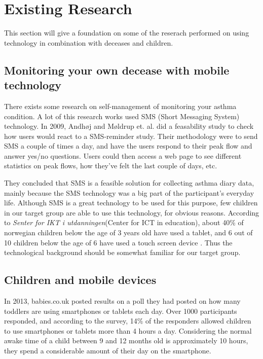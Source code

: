 \section{Existing Research}
\label{sec:existing-research}

This section will give a foundation on some of the reserach performed on using technology in combination with deceases and children. 


\subsection{Monitoring your own decease with mobile technology}
There exists some research on self-management of monitoring your asthma condition. A lot of this research works used SMS (Short Messaging System) technology. In 2009, Andh\o j and M\o ldrup et. al.\cite{anhoj2004feasibility} did a feasability study to check how users would react to a SMS-reminder study. Their methodology were to send SMS a couple of times a day, and have the users respond to their peak flow and answer yes/no questions. Users could then access a web page to see different statistics on peak flows, how they've felt the last couple of days, etc.

They concluded that SMS is a feasible solution for collecting asthma diary data, mainly because the SMS technology was a big part of the participant's everyday life. Although SMS is a great technology to be used for this purpose, few children in our target group are able to use this technology, for obvious reasons. According to \emph{Senter for IKT i utdanningen}(Center for ICT in education), about 40\% of norwegian children below the age of 3 years old have used a tablet, and 6 out of 10 children below the age of 6 have used a touch screen device \cite{nrkchilduse}. Thus the technological background should be somewhat familiar for our target group. 

\subsection{Children and mobile devices}
In 2013, babies.co.uk posted results on a poll they had posted on how many toddlers are using smartphones or tablets each day\cite{babiesusageoftablets}. Over 1000 participants responded,  and according to the survey, 14\% of the responders allowed children to use smartphones or tablets more than 4 hours a day. Considering the normal awake time of a child between 9 and 12 months old is approximately 10 hours, they spend a considerable amount of their day on the smartphone.        


